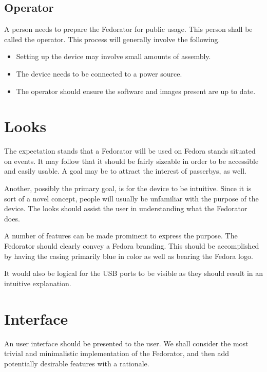         \subsection{Operator}
            A person needs to prepare the Fedorator for public usage.  This person shall be called the operator.  This process will generally involve the following.
            
            \begin{itemize}
                \item Setting up the device may involve small amounts of assembly.
                \item The device needs to be connected to a power source.
                \item The operator should ensure the software and images present are up to date.
            \end{itemize}
    \section{Looks}
        The expectation stands that a Fedorator will be used on Fedora stands situated on events.  It may follow that it should be fairly sizeable in order to be accessible and easily usable.  A goal may be to attract the interest of passerbys, as well.
        
        Another, possibly the primary goal, is for the device to be intuitive.  Since it is sort of a novel concept, people will usually be unfamiliar with the purpose of the device.  The looks should assist the user in understanding what the Fedorator does.
        
        A number of features can be made prominent to express the purpose.  The Fedorator should clearly convey a Fedora branding.  This should be accomplished by having the casing primarily blue in color as well as bearing the Fedora logo.
        
        
        It would also be logical for the USB ports to be visible as they should result in an intuitive explanation.
        
    \section{Interface}
        An user interface should be presented to the user.  We shall consider the most trivial and minimalistic implementation of the Fedorator, and then add potentially desirable features with a rationale.
        

